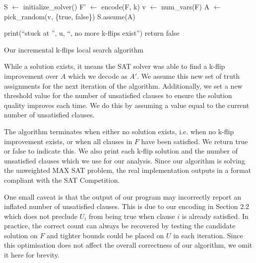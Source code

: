 \documentclass{article}
\begin{document}
\begin{algorithm}[H]
\SetAlgoLined
\DontPrintSemicolon

  \;

  S $\gets$ initialize\_solver()\;
  F' $\gets$ encode(F, k)\;
  v $\gets$ num\_vars(F)\;
  A $\gets$ pick\_random(v, \{true, false\})\;
  S.assume(A)\;
  \;

 \;
   {
    print(“stuck at ”, u, “, no more k-flips exist”)\;
    return false
  }
 \caption{Our incremental k-flips local search algorithm}
\end{algorithm} \vspace{5mm}

\noindent While a solution exists, it means the SAT solver was able to find a
k-flip improvement over $A$ which we decode as $A'$. We assume this new set of
truth assignments for the next iteration of the algorithm. Additionally, we set
a new threshold value for the number of unsatisfied clauses to ensure the
solution quality improves each time. We do this by assuming a value equal to
the current number of unsatisfied clauses.

The algorithm terminates when either no solution exists, i.e. when no k-flip
improvement exists, or when all clauses in $F$ have been satisfied. We return
true or false to indicate this. We also print each k-flip solution and the
number of unsatisfied clauses which we use for our analysis. Since our algorithm
is solving the unweighted MAX SAT problem\cite{sung2006maximum}, the real
implementation outputs in a format compliant with the SAT
Competition\cite{maxsat2020output}.

One small caveat is that the output of our program may incorrectly report an
inflated number of unsatisfied clauses. This is due to our encoding in Section
2.2 which does not preclude $U_i$ from being true when clause $i$ is already
satisfied. In practice, the correct count can always be recovered by testing
the candidate solution on $F$ and tighter bounds could be placed on $U$ in each
iteration. Since this optimisation does not affect the overall correctness of
our algorithm, we omit it here for brevity.
\end{document}
